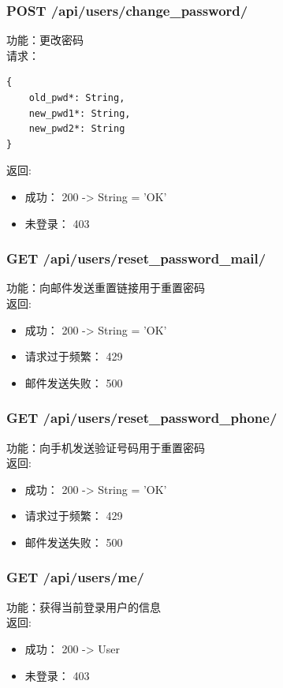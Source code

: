 \subsubsection{POST /api/users/change\_password/}

\noindent
功能：更改密码\\
请求：
\begin{lstlisting}[numbers=none, frame=none]
{
    old_pwd*: String,
    new_pwd1*: String,
    new_pwd2*: String
}
\end{lstlisting}
返回:
\begin{itemize}
	\item 成功： 200 -> String = 'OK'
	\item 未登录： 403
\end{itemize}

\subsubsection{GET /api/users/reset\_password\_mail/}

\noindent
功能：向邮件发送重置链接用于重置密码\\
返回:
\begin{itemize}
	\item 成功： 200 -> String = 'OK'
	\item 请求过于频繁： 429
	\item 邮件发送失败： 500
\end{itemize}


\subsubsection{GET /api/users/reset\_password\_phone/}

\noindent
功能：向手机发送验证号码用于重置密码\\
返回:
\begin{itemize}
\item 成功： 200 -> String = 'OK'
\item 请求过于频繁： 429
\item 邮件发送失败： 500
\end{itemize}



\subsubsection{GET /api/users/me/}

\noindent
功能：获得当前登录用户的信息\\
返回:
\begin{itemize}
	\item 成功： 200 -> User
	\item 未登录： 403
\end{itemize}


